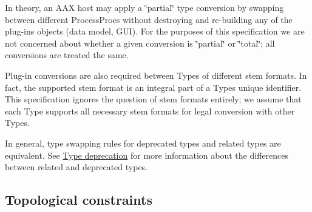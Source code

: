 In theory, an A\+A\+X host may apply a \char`\"{}partial\char`\"{} type conversion by swapping between different Process\+Procs without destroying and re-\/building any of the plug-\/in\textquotesingle{}s objects (data model, G\+U\+I). For the purposes of this specification we are not concerned about whether a given conversion is \char`\"{}partial\char`\"{} or \char`\"{}total\char`\"{}; all conversions are treated the same.

Plug-\/in conversions are also required between Types of different stem formats. In fact, the supported stem format is an integral part of a Type\textquotesingle{}s unique identifier. This specification ignores the question of stem formats entirely; we assume that each Type supports all necessary stem formats for legal conversion with other Types.

In general, type swapping rules for deprecated types and related types are equivalent. See \hyperlink{a00356_advancedTopics_relatedTypes_deprecation}{Type deprecation} for more information about the differences between related and deprecated types.\hypertarget{a00356_advancedTopics_relatedTypes_constraints}{}\subsection{Topological constraints}\label{a00356_advancedTopics_relatedTypes_constraints}


